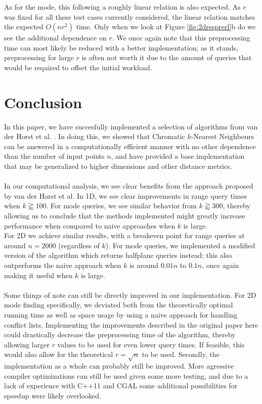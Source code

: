 \documentclass{article}
\newcommand{\fb}[1]{{\color{blue}#1}}
\begin{document}
{As for the mode, this following a roughly linear relation is also expected. As $r$ was fixed for all these test cases currently considered, the linear relation matches the expected \fb{$O(nr^2)$} time. Only when we look at Figure \ref{fig:2dresprerl}b do we see the additional dependence on $r$. We once again note that this preprocessing time can most likely be reduced with a better implementation; as it stands, preprocessing for large $r$ is often not worth it due to the amount of queries that would be required to offset the initial workload.}
\section{Conclusion}
\fb{
    In this paper, we have succesfully implemented a selection of algorithms from van der Horst et al. \cite{vanderhorst_et_al:LIPIcs.ESA.2022.67}. In doing this, we showed that Chromatic $k$-Nearest Neighbours can be answered in a computationally efficient manner with no other dependence than the number of input points $n$, and have provided a base implementation that may be generalized to higher dimensions and other distance metrics. \\\\
    In our computational analysis, we see clear benefits from the approach proposed by van der Horst et al. In 1D, we see clear improvements in range query times when $k \gtrapprox 100$. For mode queries, we see similar behavior from $k \gtrapprox 300$, thereby allowing us to conclude that the methods implemented might greatly increase performance when compared to naive approaches when $k$ is large. \\
    For 2D we achieve similar results, with a breakeven point for range queries at around $n=2000$ (regardless of $k$). For mode queries, we implemented a modified version of the algorithm which returns halfplane queries instead; this also outperforms the naive approach when $k$ is around $0.01n$ to $0.1n$, once again making it useful when $k$ is large. \\\\
    Some things of note can still be directly improved in our implementation. For 2D mode finding specifically, we deviated both from the theoretically optimal running time as well as space usage by using a naive approach for handling conflict lists. Implementing the improvements described in the original paper here could drastically decrease the preprocessing time of the algorithm, thereby allowing larger $r$ values to be used for even lower query times. If feasible, this would also allow for the theoretical $r=\sqrt{n}$ to be used. Secondly, the implementation as a whole can probably still be improved. More agressive compiler optimizations can still be used given some more testing, and due to a lack of experience with C++11 and CGAL some additional possibilities for speedup were likely overlooked. \\\\
}
\end{document}
